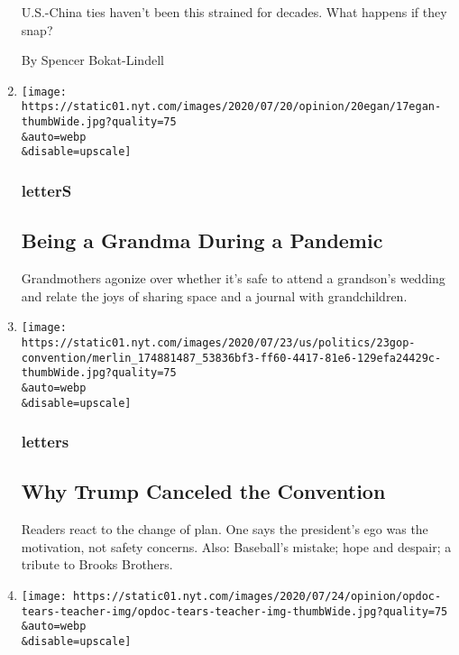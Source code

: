 \begin{enumerate}
  U.S.-China ties haven't been this strained for decades. What happens
  if they snap?

  By Spencer Bokat-Lindell
\item
  \href{/2020/07/28/opinion/letters/pandemic-families.html}{}

  \texttt{[image: https://static01.nyt.com/images/2020/07/20/opinion/20egan/17egan-thumbWide.jpg?quality=75\\\&auto=webp\\\&disable=upscale]}

  \hypertarget{letters}{%
  \subsubsection{letterS}\label{letters}}

  \hypertarget{being-a-grandma-during-a-pandemic}{%
  \subsection{Being a Grandma During a
  Pandemic}\label{being-a-grandma-during-a-pandemic}}

  Grandmothers agonize over whether it's safe to attend a grandson's
  wedding and relate the joys of sharing space and a journal with
  grandchildren.
\item
  \href{/2020/07/28/opinion/letters/trump-convention.html}{}

  \texttt{[image: https://static01.nyt.com/images/2020/07/23/us/politics/23gop-convention/merlin\_174881487\_53836bf3-ff60-4417-81e6-129efa24429c-thumbWide.jpg?quality=75\\\&auto=webp\\\&disable=upscale]}

  \hypertarget{letters-1}{%
  \subsubsection{letters}\label{letters-1}}

  \hypertarget{why-trump-canceled-the-convention}{%
  \subsection{Why Trump Canceled the
  Convention}\label{why-trump-canceled-the-convention}}

  Readers react to the change of plan. One says the president's ego was
  the motivation, not safety concerns. Also: Baseball's mistake; hope
  and despair; a tribute to Brooks Brothers.
\item
  \href{/2020/07/28/opinion/tears-teacher-crying-japan.html}{}

  \texttt{[image: https://static01.nyt.com/images/2020/07/24/opinion/opdoc-tears-teacher-img/opdoc-tears-teacher-img-thumbWide.jpg?quality=75\\\&auto=webp\\\&disable=upscale]}


\end{enumerate}
